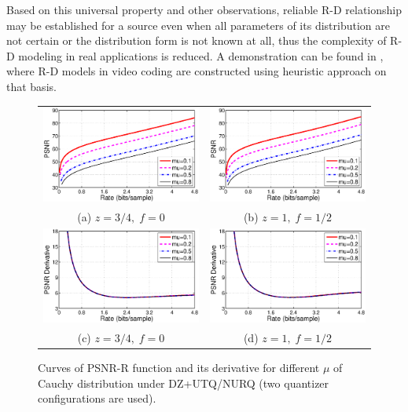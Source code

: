 \documentclass[smallabstract,smallcaptions]{dccpaper}
\begin{document}
Based on this universal property and other observations, reliable R-D relationship may be established for a source even when all parameters of its distribution are not certain or the distribution form is not known at all, thus the complexity of R-D modeling in real applications is reduced. A demonstration can be found in \cite{Sun_TCSVT2009}, where R-D models in video coding are constructed using heuristic approach on that basis.

\begin{figure}
\begin{center}
\begin{tabular}{cc}
\includegraphics[width = 0.5\linewidth]{Figures/section3/RD_Cauchy_z=0_75_p=0} &
\includegraphics[width = 0.5\linewidth]{Figures/section3/RD_Cauchy_z=1_p=0_5} \\
{\small (a) $z=3/4,\;f=0$} & {\small (b) $z=1,\;f=1/2$} \\
\includegraphics[width = 0.5\linewidth]{Figures/section3/RDDerivative_Cauchy_z=0_75_p=0} &
\includegraphics[width = 0.5\linewidth]{Figures/section3/RDDerivative_Cauchy_z=1_p=0_5} \\
{\small (c) $z=3/4,\;f=0$} & {\small (d) $z=1,\;f=1/2$}
\end{tabular}
\end{center}
\vspace{-20pt}
\caption{\label{fig:RD_mu}
Curves of PSNR-R function and its derivative for different $\mu$ of Cauchy distribution under DZ+UTQ/NURQ (two quantizer configurations are used).}
\end{figure}
\end{document}

